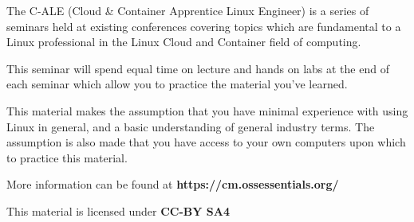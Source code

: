 \alecopyright

\par
The C-ALE (Cloud \& Container Apprentice Linux Engineer) is
a series of seminars held at existing conferences covering
topics which are fundamental to a Linux professional in
the Linux Cloud and Container field of computing.

\par
This seminar will spend equal time on lecture and hands on
labs at the end of each seminar which allow you to practice
the material you've learned.

\begin{lfbox}
   This material makes the assumption that you have minimal
   experience with using Linux in general, and a basic
   understanding of general industry terms.
   The assumption is also made that you have access to your
   own computers upon which to practice this material.
\end{lfbox}

\par
More information can be found at \textbf{https://cm.ossessentials.org/}

\par
This material is licensed under \textbf{CC-BY SA4}
